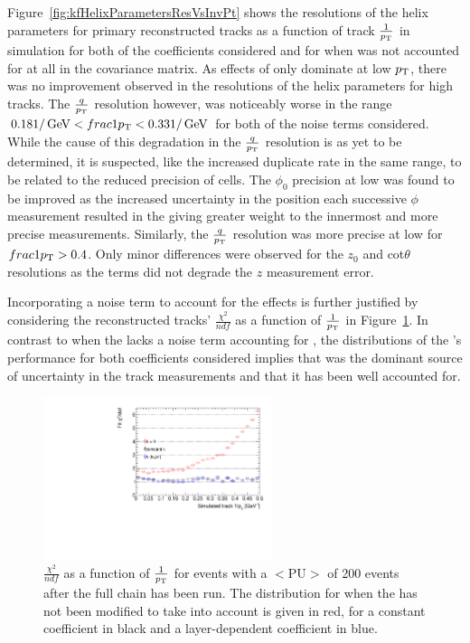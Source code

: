 Figure~\ref{fig:kfHelixParametersResVsInvPt} shows the resolutions of the helix parameters for primary reconstructed tracks as a function of track $\frac{1}{p_{\mathrm{T}}}$ in simulation for both of the \MS coefficients considered and for when \MS was not accounted for at all in the \KF covariance matrix.
As effects of \MS only dominate at low $p_{\mathrm{T}}$, there was no improvement observed in the resolutions of the helix parameters for high \pT tracks.
The $\frac{q}{p_{\mathrm{T}}}$ resolution however, was noticeably worse in the range $0.18 1/\,\text{Ge\hspace{-.08em}V} < frac{1}{p_{\mathrm{T}}}< 0.33 1/\,\text{Ge\hspace{-.08em}V}$ for both of the \MS noise terms considered.
While the cause of this degradation in the $\frac{q}{p_{\mathrm{T}}}$ resolution is as yet to be determined, it is suspected, like the increased duplicate rate in the same \pT range, to be 
related to the reduced precision of \HT cells.
The $\phi_{0}$ precision at low \pT was found to be improved as the increased uncertainty in the position each successive $\phi$ measurement resulted in the \KF giving greater weight to the innermost and more precise measurements. 
Similarly, the $\frac{q}{p_{\mathrm{T}}}$ resolution was more precise at low \pT for $frac{1}{p_{\mathrm{T}}} > 0.4$. 
Only minor differences were observed for the $z_{0}$ and cot$\theta$ resolutions as the \MS terms did not degrade the $z$ measurement error.

Incorporating a noise term to account for the effects \MS is further justified by considering the reconstructed tracks' $\frac{\chi^{2}}{ndf}$ as a function of $\frac{1}{p_{\mathrm{T}}}$ in Figure~\ref{fig:2GeVTiltChi2Ndf}.
In contrast to when the \KF lacks a noise term accounting for \MS, the distributions of the \KF's performance for both \MS coefficients considered implies that \MS was the dominant source of uncertainty in the track measurements and that it has been well accounted for.

\begin{figure}[htb]
\centering
\includegraphics[width=0.6\textwidth]{figs/tk-upgrade/results-lowPtTracking/kfChi2NdfVsInvPtTiltedGeometry_5000.pdf}
\caption{ $\frac{\chi^{2}}{ndf}$ as a function of $\frac{1}{p_{\mathrm{T}}}$ for \ttbar events with a $<\textrm{PU}>$ of 200 events after the full chain has been run. The distribution for when the \KF has not been modified to take \MS into account is given in red, for a constant \MS coefficient in black and a layer-dependent \MS coefficient in blue.
}
\label{fig:2GeVTiltChi2Ndf}	
\end{figure}

